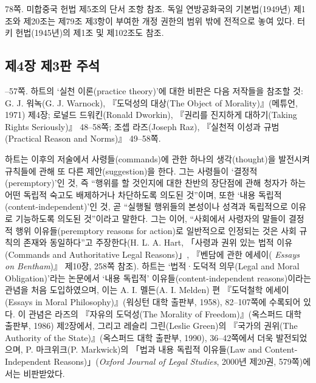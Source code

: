 {\noteentry 78쪽.  미합중국 헌법 제5조의 단서 조항
참조. 독일 연방공화국의 기본법(1949년) 제1조와 제20조는 제79조 제3항이
부여한 개정 권한의 범위 밖에 전적으로 놓여 있다. 터키 헌법(1945년)의
제1조 및 제102조도 참조.

\subsection{제4장 제3판
주석}\label{uxc81c4uxc7a5-uxc81c3uxd310-uxc8fcuxc11d}

--57쪽.  하트의 ‘실천 이론(practice
theory)’에 대한 비판은 다음 저작들을 참조할 것: G. J. 워녹(G. J.
Warnock), 『도덕성의 대상(The Object of Morality)』(메튜언, 1971) 제4장;
로널드 드워킨(Ronald Dworkin), 『권리를 진지하게 대하기(Taking Rights
Seriously)』 48--58쪽; 조셉 라즈(Joseph Raz), 『실천적 이성과
규범(Practical Reason and Norms)』 49--58쪽.

하트는 이후의 저술에서 사령들(commands)에 관한 하나의 생각(thought)을
발전시켜 규칙들에 관해 또 다른 제안(suggestion)을 한다. 그는 사령들이
‘결정적(peremptory)’인 것, 즉 “행위를 할 것인지에 대한 찬반의 장단점에
관해 청자가 하는 어떤 독립적 숙고도 배제하거나 차단하도록 의도된
것”이며, 또한 ‘내용 독립적(content-independent)’인 것, 곧 “실행될
행위들의 본성이나 성격과 독립적으로 이유로 기능하도록 의도된 것”이라고
말한다. 그는 이어, “사회에서 사령자의 말들이 결정적 행위
이유들(peremptory reasons for action)로 일반적으로 인정되는 것은 사회
규칙의 존재와 동일하다”고 주장한다(H. L. A. Hart, 「사령과 권위 있는
법적 이유(Commands and Authoritative Legal Reasons)」, 『벤담에 관한
에세이( \emph{Essays on Bentham})』 제10장, 258쪽 참조). 하트는
‘법적·도덕적 의무(Legal and Moral Obligation)’라는 논문에서 ‘내용
독립적’ 이유들(content-independent reasons)이라는 관념을 처음
도입하였으며, 이는 A. I. 멜든(A. I. Melden) 편 『도덕철학 에세이(Essays
in Moral Philosophy)』(워싱턴 대학 출판부, 1958), 82--107쪽에 수록되어
있다. 이 관념은 라즈의 『자유의 도덕성(The Morality of
Freedom)』(옥스퍼드 대학 출판부, 1986) 제2장에서, 그리고 레슬리
그린(Leslie Green)의 『국가의 권위(The Authority of the
State)』(옥스퍼드 대학 출판부, 1990), 36--42쪽에서 더욱 발전되었으며, P.
마크위크(P. Markwick)의 「법과 내용 독립적 이유들(Law and
Content-Independent Reasons)」(\emph{Oxford Journal of Legal Studies},
2000년 제20권, 579쪽)에서는 비판받았다.

}
